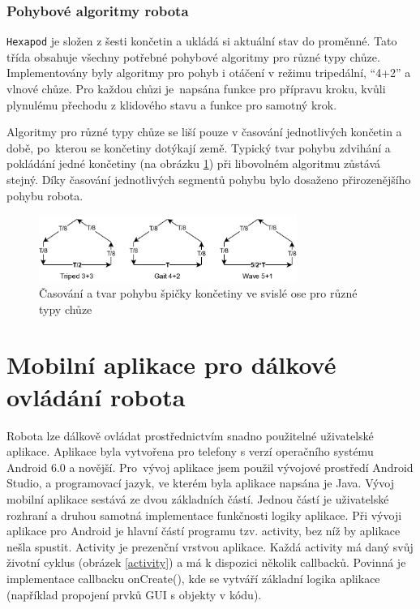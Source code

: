 \subsubsection*{Pohybové algoritmy robota}
\texttt{Hexapod} je složen z šesti končetin a ukládá si aktuální stav do proměnné. Tato třída obsahuje všechny potřebné pohybové algoritmy pro různé typy chůze. Implementovány byly algoritmy pro pohyb i otáčení v režimu tripedální, ``4+2'' a vlnové chůze. Pro každou chůzi je~napsána funkce pro přípravu kroku, kvůli plynulému přechodu z klidového stavu a funkce pro samotný krok.

Algoritmy pro různé typy chůze se liší pouze v časování jednotlivých končetin a době, po~kterou se končetiny dotýkají země. Typický tvar pohybu zdvihání a pokládání jedné končetiny (na obrázku \ref{legmovement}) při libovolném algoritmu zůstává stejný. Díky časování jednotlivých segmentů pohybu bylo dosaženo přirozenějšího pohybu robota.

\begin{figure}[hbt]
	\centering
	\includegraphics[width=0.75\textwidth]{obrazky-figures/legmovement.png}
	\caption{Časování a tvar pohybu špičky končetiny ve svislé ose pro různé typy chůze}
    \label{legmovement}
\end{figure}


\section{Mobilní aplikace pro dálkové ovládání robota}
Robota lze dálkově ovládat prostřednictvím snadno použitelné uživatelské aplikace. Aplikace byla vytvořena pro telefony s verzí operačního systému Android 6.0 a novější. Pro~vývoj aplikace jsem použil vývojové prostředí Android Studio, a programovací jazyk, ve kterém byla aplikace napsána je Java. Vývoj mobilní aplikace sestává ze dvou základních částí. Jednou částí je uživatelské rozhraní a druhou samotná implementace funkčnosti logiky aplikace. Při vývoji aplikace pro Android je hlavní částí programu tzv. activity, bez níž by aplikace nešla spustit. Activity je prezenční vrstvou aplikace. Každá activity má daný svůj životní cyklus (obrázek \ref{activity}) a má k dispozici několik callbacků. Povinná je implementace callbacku onCreate(), kde se vytváří základní logika aplikace (například propojení prvků GUI s objekty v kódu).

